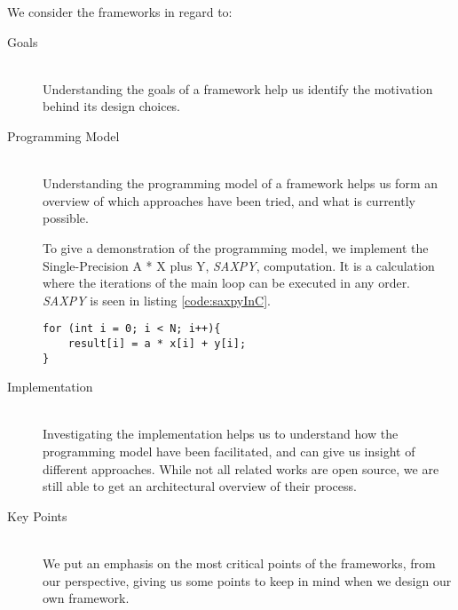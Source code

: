 We consider the frameworks in regard to:
\begin{description}
\item[Goals] \hfill \\
Understanding the goals of a framework help us identify the motivation behind its design choices.

\item[Programming Model] \hfill \\
Understanding the programming model of a framework helps us form an overview of which approaches have been tried, and what is currently possible. 

To give a demonstration of the programming model, we implement the Single-Precision A * X plus Y, \textit{SAXPY}, computation. It is a calculation where the iterations of the main loop can be executed in any order. \textit{SAXPY} is seen in listing \ref{code:saxpyInC}.
\begin{lstlisting}[caption={The \textit{SAXPY} computation in C.}, label=code:saxpyInC] 
for (int i = 0; i < N; i++){
    result[i] = a * x[i] + y[i];
}
\end{lstlisting}

\item[Implementation] \hfill \\
Investigating the implementation helps us to understand how the programming model have been facilitated, and can give us insight of different approaches. While not all related works are open source, we are still able to get an architectural overview of their process.

\item[Key Points] \hfill \\
We put an emphasis on the most critical points of the frameworks, from our perspective, giving us some points to keep in mind when we design our own framework.
\end{description}